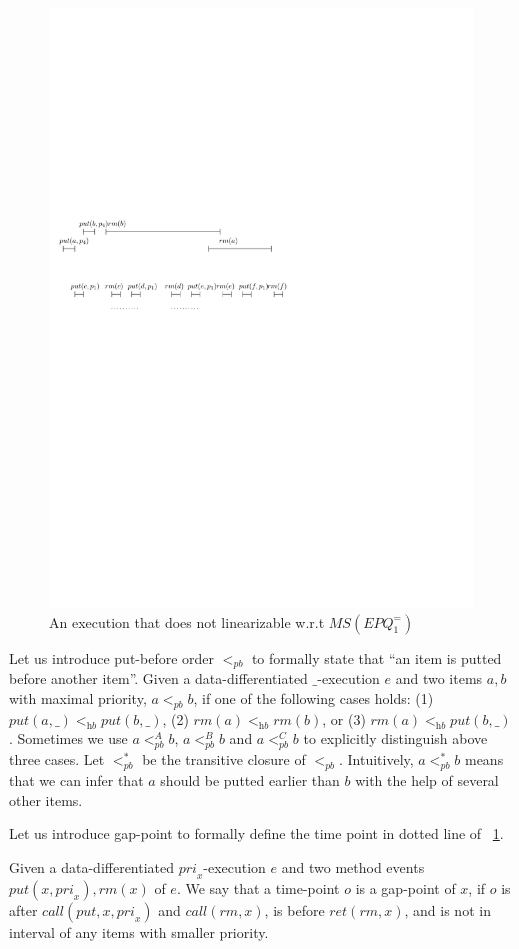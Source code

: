\begin{figure}[htbp]
  \centering
  \includegraphics[width=0.6 \textwidth]{figures/PIC-HIS-INTRO-PB-ORDER-EPQ.pdf}
  \caption{An execution that does not linearizable w.r.t $\textit{MS}(\textit{EPQ}_1^{=})$}
  \label{fig:introduce pb order}
\end{figure}

Let us introduce put-before order $<_{\textit{pb}}$ to formally state that ``an item is putted before another item''. Given a data-differentiated $\_$-execution $e$ and two items $a,b$ with maximal priority, $a <_{\textit{pb}} b$, if one of the following cases holds: (1) $\textit{put}(a,\_) <_{\textit{hb}} \textit{put}(b,\_)$, (2) $\textit{rm}(a) <_{\textit{hb}} \textit{rm}(b)$, or (3) $\textit{rm}(a) <_{\textit{hb}} \textit{put}(b,\_)$. Sometimes we use $a <_{\textit{pb}}^A b$, $a <_{\textit{pb}}^B b$ and $a <_{\textit{pb}}^C b$ to explicitly distinguish above three cases. Let $<_{\textit{pb}}^*$ be the transitive closure of $<_{\textit{pb}}$. Intuitively, $a <_{\textit{pb}}^* b$ means that we can infer that $a$ should be putted earlier than $b$ with the help of several other items.

Let us introduce gap-point to formally define the time point in dotted line of \figurename~\ref{fig:introduce pb order}.

\begin{definition}\label{def:gap-point for matched put and rm operations}
Given a data-differentiated $\textit{pri}_x$-execution $e$ and two method events $\textit{put}(x,\textit{pri}_x),\textit{rm}(x)$ of $e$. We say that a time-point $o$ is a gap-point of $x$, if $o$ is after $\textit{call}(\textit{put},x,\textit{pri}_x)$ and $\textit{call}(\textit{rm},x)$, is before $\textit{ret}(\textit{rm},x)$, and is not in interval of any items with smaller priority.
\end{definition}

